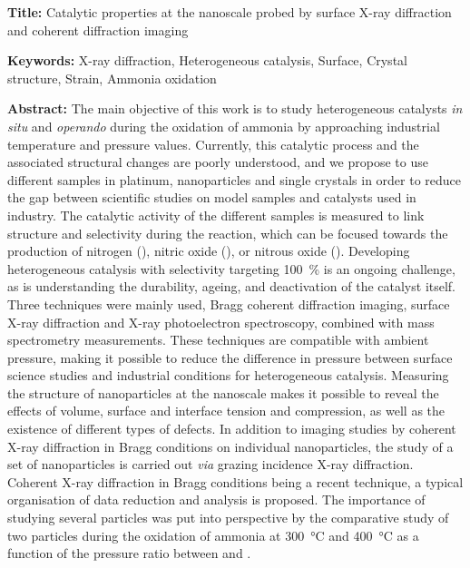\begin{mdframed}[linecolor=Prune,linewidth=1]

\textbf{Title:} Catalytic properties at the nanoscale probed by surface X-ray diffraction and coherent diffraction imaging

\noindent \textbf{Keywords:} X-ray diffraction, Heterogeneous catalysis, Surface, Crystal structure, Strain, Ammonia oxidation

\vspace{-.5cm}
\begin{multicols}{2}
\noindent \textbf{Abstract:}
The main objective of this work is to study heterogeneous catalysts \textit{in situ} and \textit{operando} during the oxidation of ammonia by approaching industrial temperature and pressure values.
Currently, this catalytic process and the associated structural changes are poorly understood, and we propose to use different samples in platinum, nanoparticles and single crystals in order to reduce the gap between scientific studies on model samples and catalysts used in industry.
The catalytic activity of the different samples is measured to link structure and selectivity during the reaction, which can be focused towards the production of nitrogen (), nitric oxide (), or nitrous oxide ().
Developing heterogeneous catalysis with selectivity targeting \qty{100}{\percent} is an ongoing challenge, as is understanding the durability, ageing, and deactivation of the catalyst itself.
Three techniques were mainly used, Bragg coherent diffraction imaging, surface X-ray diffraction and X-ray photoelectron spectroscopy, combined with mass spectrometry measurements.
These techniques are compatible with ambient pressure, making it possible to reduce the difference in pressure between surface science studies and industrial conditions for heterogeneous catalysis.
Measuring the structure of nanoparticles at the nanoscale makes it possible to reveal the effects of volume, surface and interface tension and compression, as well as the existence of different types of defects.
In addition to imaging studies by coherent X-ray diffraction in Bragg conditions on individual nanoparticles, the study of a set of nanoparticles is carried out \textit{via} grazing incidence X-ray diffraction.
Coherent X-ray diffraction in Bragg conditions being a recent technique, a typical organisation of data reduction and analysis is proposed.
The importance of studying several particles was put into perspective by the comparative study of two particles during the oxidation of ammonia at \qty{300}{\degreeCelsius} and \qty{400}{\degreeCelsius} as a function of the pressure ratio between  and .

\end{multicols}
\end{mdframed}
